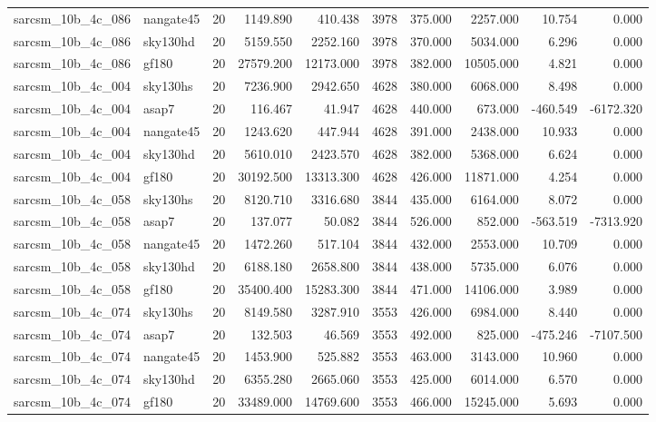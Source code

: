 \documentclass{article}
\begin{document}
\begin{longtable}{llrrrrrrrr}
sarcsm\_10b\_4c\_086 & nangate45 & 20 & 1149.890 & 410.438 & 3978 & 375.000 & 2257.000 & 10.754 & 0.000 \\
sarcsm\_10b\_4c\_086 & sky130hd & 20 & 5159.550 & 2252.160 & 3978 & 370.000 & 5034.000 & 6.296 & 0.000 \\
sarcsm\_10b\_4c\_086 & gf180 & 20 & 27579.200 & 12173.000 & 3978 & 382.000 & 10505.000 & 4.821 & 0.000 \\
sarcsm\_10b\_4c\_004 & sky130hs & 20 & 7236.900 & 2942.650 & 4628 & 380.000 & 6068.000 & 8.498 & 0.000 \\
sarcsm\_10b\_4c\_004 & asap7 & 20 & 116.467 & 41.947 & 4628 & 440.000 & 673.000 & -460.549 & -6172.320 \\
sarcsm\_10b\_4c\_004 & nangate45 & 20 & 1243.620 & 447.944 & 4628 & 391.000 & 2438.000 & 10.933 & 0.000 \\
sarcsm\_10b\_4c\_004 & sky130hd & 20 & 5610.010 & 2423.570 & 4628 & 382.000 & 5368.000 & 6.624 & 0.000 \\
sarcsm\_10b\_4c\_004 & gf180 & 20 & 30192.500 & 13313.300 & 4628 & 426.000 & 11871.000 & 4.254 & 0.000 \\
sarcsm\_10b\_4c\_058 & sky130hs & 20 & 8120.710 & 3316.680 & 3844 & 435.000 & 6164.000 & 8.072 & 0.000 \\
sarcsm\_10b\_4c\_058 & asap7 & 20 & 137.077 & 50.082 & 3844 & 526.000 & 852.000 & -563.519 & -7313.920 \\
sarcsm\_10b\_4c\_058 & nangate45 & 20 & 1472.260 & 517.104 & 3844 & 432.000 & 2553.000 & 10.709 & 0.000 \\
sarcsm\_10b\_4c\_058 & sky130hd & 20 & 6188.180 & 2658.800 & 3844 & 438.000 & 5735.000 & 6.076 & 0.000 \\
sarcsm\_10b\_4c\_058 & gf180 & 20 & 35400.400 & 15283.300 & 3844 & 471.000 & 14106.000 & 3.989 & 0.000 \\
sarcsm\_10b\_4c\_074 & sky130hs & 20 & 8149.580 & 3287.910 & 3553 & 426.000 & 6984.000 & 8.440 & 0.000 \\
sarcsm\_10b\_4c\_074 & asap7 & 20 & 132.503 & 46.569 & 3553 & 492.000 & 825.000 & -475.246 & -7107.500 \\
sarcsm\_10b\_4c\_074 & nangate45 & 20 & 1453.900 & 525.882 & 3553 & 463.000 & 3143.000 & 10.960 & 0.000 \\
sarcsm\_10b\_4c\_074 & sky130hd & 20 & 6355.280 & 2665.060 & 3553 & 425.000 & 6014.000 & 6.570 & 0.000 \\
sarcsm\_10b\_4c\_074 & gf180 & 20 & 33489.000 & 14769.600 & 3553 & 466.000 & 15245.000 & 5.693 & 0.000 \\

\end{longtable}
\end{document}

